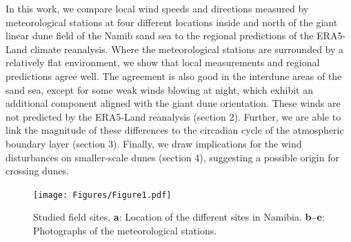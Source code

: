 In this work, we compare local wind speeds and directions measured by meteorological stations at four different locations inside and north of the giant linear dune field of the Namib sand sea to the regional predictions of the ERA5-Land climate reanalysis. Where the meteorological stations are surrounded by a relatively flat environment, we show that local measurements and regional predictions agree well. The agreement is also good in the interdune areas of the sand sea, except for some weak winds blowing at night, which exhibit an additional component aligned with the giant dune orientation. These winds are not predicted by the ERA5-Land reanalysis (section 2). Further, we are able to link the magnitude of these differences to the circadian cycle of the atmospheric boundary layer (section 3). Finally, we draw implications for the wind disturbances on smaller-scale dunes (section 4), suggesting a possible origin for crossing dunes.


\begin{figure}[t]
  \centering
  \texttt{[image: Figures/Figure1.pdf]}
  \caption{Studied field sites. \textbf{a}: Location of the different sites in Namibia. \textbf{b--e}: Photographs of the meteorological stations.}
  \label{Fig1}
\end{figure}

